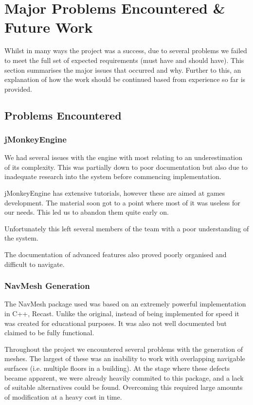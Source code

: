 

\section{Major Problems Encountered \& Future Work}

Whilst in many ways the project was a success, due to several problems
we failed to meet the full set of expected requirements (must have
and should have). This section summarises the major issues that occurred
and why. Further to this, an explanation of how the work should be
continued based from experience so far is provided.


\subsection{Problems Encountered}
\label{Problems:subsec:problemsecountered}

\subsubsection{jMonkeyEngine}

We had several issues with the engine with most relating to an underestimation
of its complexity. This was partially down to poor documentation but
also due to inadequate research into the system before commencing
implementation.

jMonkeyEngine has extensive tutorials, however these are aimed at games
development. The material soon got to a point where most of it was
useless for our needs. This led us to abandon them quite early on.

Unfortunately this left several members of the team with a poor understanding
of the system.

The documentation of advanced features also proved poorly organised and difficult to navigate.

\subsubsection{NavMesh Generation}
\label{Problems:subsubsec:navmesh}
The NavMesh package used was based on an extremely powerful implementation
in C++, Recast\cite{Recast}. Unlike the original, instead of being implemented for
speed it was created for educational purposes. It was also not well
documented but claimed to be fully functional.

Throughout the project we encountered several problems with the generation
of meshes. The largest of these was an inability to work with overlapping
navigable surfaces (i.e. multiple floors in a building). At the stage where these defects became apparent, we were already
heavily commited to this package, and a lack of suitable alternatives could be found. Overcoming
this required large amounts of modification at a heavy cost in time.


